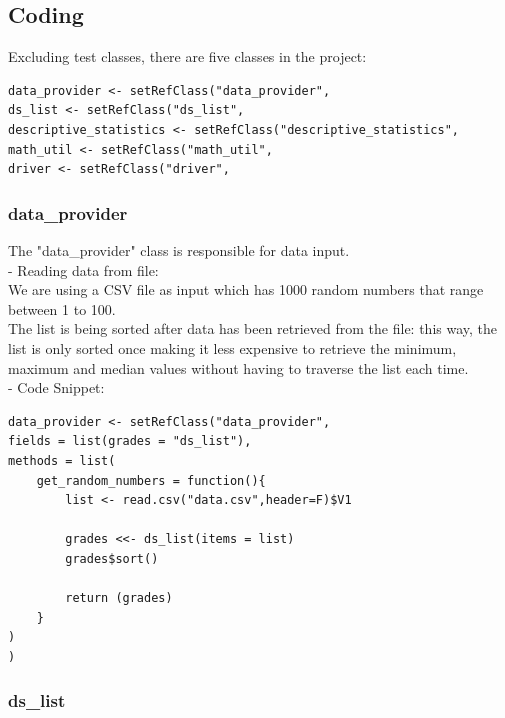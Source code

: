 \documentclass[11pt]{article}
\begin{document}
\subsection{Coding}

Excluding test classes, there are five classes in the project:\\

\begin{lstlisting}
data_provider <- setRefClass("data_provider",
ds_list <- setRefClass("ds_list",
descriptive_statistics <- setRefClass("descriptive_statistics", 
math_util <- setRefClass("math_util",
driver <- setRefClass("driver",

\end{lstlisting}

\subsubsection{data\_provider}

The "data\_provider" class is responsible for data input.\\

- Reading data from file:\\

We are using a CSV file as input which has 1000 random numbers that range between 1 to 100.\\

The list is being sorted after data has been retrieved from the file: this way, the list is only sorted once making it less expensive to retrieve the minimum, maximum and median values without having to traverse the list each time.\\

- Code Snippet:\\

\begin{lstlisting}
data_provider <- setRefClass("data_provider",
fields = list(grades = "ds_list"),
methods = list(
    get_random_numbers = function(){
        list <- read.csv("data.csv",header=F)$V1

        grades <<- ds_list(items = list)
        grades$sort()
        
        return (grades)
    }
)
)
\end{lstlisting}

\subsubsection{ds\_list}
\end{document}
